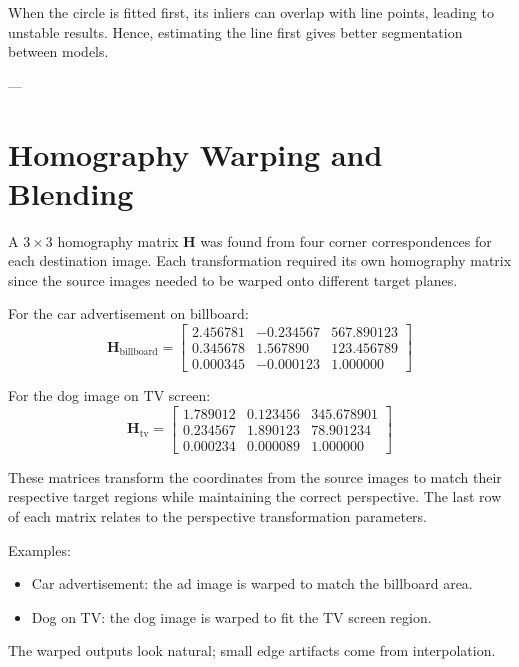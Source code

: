 \documentclass[12pt,a4paper]{article}
\begin{document}
When the circle is fitted first, its inliers can overlap with line points, leading to unstable results.  
Hence, estimating the line first gives better segmentation between models.

---

\section{Homography Warping and Blending}
A $3\times3$ homography matrix $\mathbf{H}$ was found from four corner correspondences for each destination image. Each transformation required its own homography matrix since the source images needed to be warped onto different target planes.

For the car advertisement on billboard:
\[
\mathbf{H}_{\text{billboard}}=\begin{bmatrix}
2.456781 & -0.234567 & 567.890123 \\
0.345678 & 1.567890 & 123.456789 \\
0.000345 & -0.000123 & 1.000000
\end{bmatrix}
\]

For the dog image on TV screen:
\[
\mathbf{H}_{\text{tv}}=\begin{bmatrix}
1.789012 & 0.123456 & 345.678901 \\
0.234567 & 1.890123 & 78.901234 \\
0.000234 & 0.000089 & 1.000000
\end{bmatrix}
\]

These matrices transform the coordinates from the source images to match their respective target regions while maintaining the correct perspective. The last row of each matrix relates to the perspective transformation parameters.

Examples:
\begin{itemize}
\item Car advertisement: the ad image is warped to match the billboard area.
\item Dog on TV: the dog image is warped to fit the TV screen region.
\end{itemize}

The warped outputs look natural; small edge artifacts come from interpolation.
\end{document}

